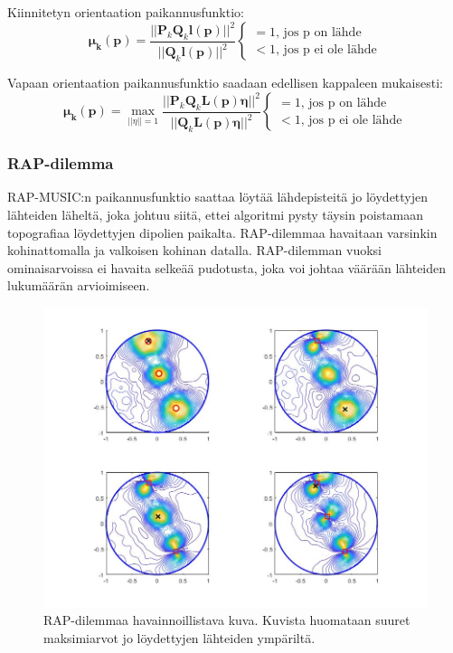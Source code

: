 Kiinnitetyn orientaation paikannusfunktio:
\begin{equation}
    \mathbf{\mu_k(p)} = \frac{||\mathbf{P}_k\mathbf{Q}_k\mathbf{l(p)}||^2}{||\mathbf{Q}_k\mathbf{l(p)}||^2}
    \begin{cases}
    =1\text{, jos p on lähde}\\
    <1\text{, jos p ei ole lähde}
     \end{cases}
\end{equation}

Vapaan orientaation paikannusfunktio saadaan edellisen kappaleen mukaisesti:
\begin{equation}
    \mathbf{\mu_k(p)} = \max_{||\eta||=1} \frac{||\mathbf{P}_k\mathbf{Q}_k\mathbf{L(p)\eta}||^2}{||\mathbf{Q}_k\mathbf{L(p)\eta}||^2}
    \begin{cases}
    =1\text{, jos p on lähde}\\
    <1\text{, jos p ei ole lähde}
     \end{cases}
\end{equation}


\subsubsection{RAP-dilemma}
RAP-MUSIC:n paikannusfunktio saattaa löytää lähdepisteitä jo löydettyjen lähteiden läheltä, joka johtuu siitä, ettei algoritmi pysty täysin poistamaan topografiaa löydettyjen dipolien paikalta. RAP-dilemmaa havaitaan varsinkin kohinattomalla ja valkoisen kohinan datalla. RAP-dilemman vuoksi ominaisarvoissa ei havaita selkeää pudotusta, joka voi johtaa väärään lähteiden lukumäärän arvioimiseen. \citep{Makela2018TruncatedLocalization}


\clearpage

\begin{figure}[ht]
    \centering
    \includegraphics[width=\textwidth]{rapdilemma.jpg}
    \caption{RAP-dilemmaa havainnoillistava kuva. Kuvista huomataan suuret maksimiarvot jo löydettyjen lähteiden ympäriltä.}
    \label{fig:dilemma}
\end{figure}